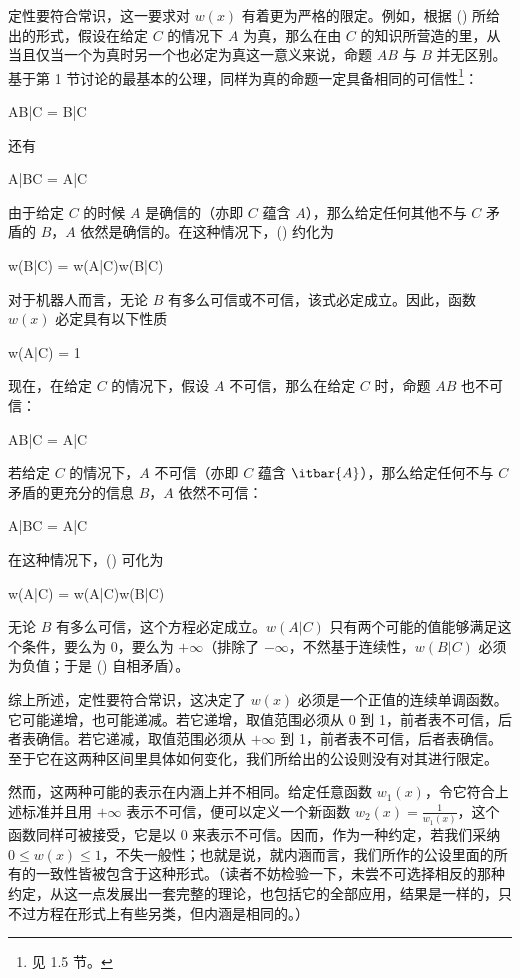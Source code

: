 定性要符合常识，这一要求对 $w(x)$ 有着更为严格的限定。例如，根据 () 所给出的形式，假设在给定 $C$ 的情况下 $A$ 为真，那么在由 $C$ 的知识所营造的里，从当且仅当一个为真时另一个也必定为真这一意义来说，命题 $AB$ 与 $B$ 并无区别。基于第 1 节讨论的最基本的公理，同样为真的命题一定具备相同的可信性\footnote{见 1.5 节。}：

\placeformula
\startformula
AB|C = B|C
\stopformula

还有

\placeformula
\startformula
A|BC = A|C
\stopformula

由于给定 $C$ 的时候 $A$ 是确信的（亦即 $C$ 蕴含 $A$），那么给定任何其他不与 $C$ 矛盾的 $B$，$A$ 依然是确信的。在这种情况下，() 约化为

\placeformula
\startformula
w(B|C) = w(A|C)w(B|C)
\stopformula

对于机器人而言，无论 $B$ 有多么可信或不可信，该式必定成立。因此，函数 $w(x)$ 必定具有以下性质

\placeformula
\startformula
w(A|C) = 1\;
\stopformula

现在，在给定 $C$ 的情况下，假设 $A$ 不可信，那么在给定 $C$ 时，命题 $AB$ 也不可信：

\placeformula
\startformula
AB|C = A|C
\stopformula

若给定 $C$ 的情况下，$A$ 不可信（亦即 $C$ 蕴含 $\itbar{A}$），那么给定任何不与 $C$ 矛盾的更充分的信息 $B$，$A$ 依然不可信：

\placeformula
\startformula
A|BC = A|C
\stopformula

在这种情况下，() 可化为

\placeformula[eq-zero]
\startformula
w(A|C) = w(A|C)w(B|C)
\stopformula

无论 $B$ 有多么可信，这个方程必定成立。$w(A|C)$ 只有两个可能的值能够满足这个条件，要么为 $0$，要么为 $+\infty$（排除了 $-\infty$，不然基于连续性，$w(B|C)$ 必须为负值；于是 (\in[eq-zero]) 自相矛盾）。

综上所述，定性要符合常识，这决定了 $w(x)$ 必须是一个正值的连续单调函数。它可能递增，也可能递减。若它递增，取值范围必须从 0 到 1，前者表不可信，后者表确信。若它递减，取值范围必须从 $+\infty$ 到 1，前者表不可信，后者表确信。至于它在这两种区间里具体如何变化，我们所给出的公设则没有对其进行限定。

然而，这两种可能的表示在内涵上并不相同。给定任意函数 $w_1(x)$，令它符合上述标准并且用 $+\infty$ 表示不可信，便可以定义一个新函数 $\displaystyle w_2(x) = \frac{1}{w_1(x)}$，这个函数同样可被接受，它是以 0 来表示不可信。因而，作为一种约定，若我们采纳 $0\le w(x)\le 1$，不失一般性；也就是说，就内涵而言，我们所作的公设里面的所有的一致性皆被包含于这种形式。（读者不妨检验一下，未尝不可选择相反的那种约定，从这一点发展出一套完整的理论，也包括它的全部应用，结果是一样的，只不过方程在形式上有些另类，但内涵是相同的。）


